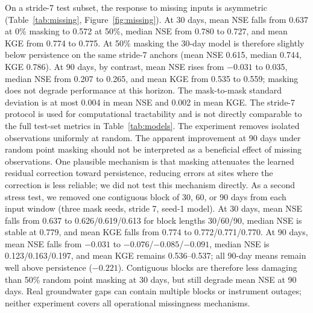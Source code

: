 \documentclass[preprint,12pt]{elsarticle}
\begin{document}
On a stride-7 test subset, the response to missing inputs is asymmetric
(Table~\ref{tab:missing}, Figure~\ref{fig:missing}). At 30 days, mean NSE falls
from 0.637 at 0\% masking to 0.572 at 50\%, median NSE from 0.780 to 0.727, and
mean KGE from 0.774 to 0.775. At 50\% masking the 30-day model is therefore
slightly below persistence on the same stride-7 anchors (mean NSE 0.615,
median 0.744, KGE 0.786). At 90 days, by contrast, mean NSE rises from $-0.031$
to 0.035, median NSE from 0.207 to 0.265, and mean KGE from 0.535 to 0.559;
masking does not degrade performance at this horizon. The mask-to-mask
standard deviation is at most 0.004 in mean NSE and 0.002 in mean KGE. The
stride-7 protocol is used for computational tractability and is not directly
comparable to the full test-set metrics in Table~\ref{tab:models}. The
experiment removes isolated observations uniformly at random. The apparent
improvement at 90 days under random point masking should not be interpreted as
a beneficial effect of missing observations. One plausible mechanism is that
masking attenuates the learned residual correction toward persistence,
reducing errors at sites where the correction is less reliable; we did not test
this mechanism directly. As a second stress test, we removed one contiguous
block of 30, 60, or 90 days from each input window (three mask seeds, stride 7,
seed-1 model). At 30 days, mean NSE
falls from 0.637 to 0.626/0.619/0.613 for block lengths 30/60/90, median NSE
is stable at 0.779, and mean KGE falls from 0.774 to 0.772/0.771/0.770. At 90
days, mean NSE falls from $-0.031$ to $-0.076$/$-0.085$/$-0.091$, median NSE is
0.123/0.163/0.197, and mean KGE remains 0.536--0.537; all 90-day means remain
well above persistence ($-0.221$). Contiguous blocks are therefore less
damaging than 50\% random point masking at 30 days, but still degrade mean NSE
at 90 days. Real groundwater gaps can contain multiple blocks or instrument
outages; neither experiment covers all operational missingness mechanisms.
\end{document}
